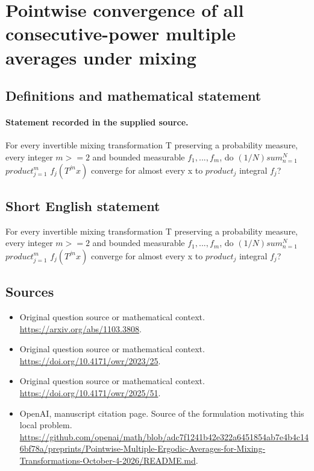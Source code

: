 \documentclass[11pt]{article}
\begin{document}
\section*{Pointwise convergence of all consecutive-power multiple averages under mixing}\label{statement}
\subsection{Definitions and mathematical statement}
\paragraph{Statement recorded in the supplied source.}
For every invertible mixing transformation T preserving a probability measure, every integer $m>=2$ and bounded measurable $f_1,...,f_m$, do $(1/N)sum_{n=1}^N$ $product_{j=1}^m$ $f_j(T^{jn}x)$ converge for almost every x to $product_j$ integral $f_j$?
\subsection{Short English statement}
For every invertible mixing transformation T preserving a probability measure, every integer $m>=2$ and bounded measurable $f_1,...,f_m$, do $(1/N)sum_{n=1}^N$ $product_{j=1}^m$ $f_j(T^{jn}x)$ converge for almost every x to $product_j$ integral $f_j$?
\subsection{Sources}
\begin{itemize}
\item[S1] Original question source or mathematical context.
\url{https://arxiv.org/abs/1103.3808}.
\item[S2] Original question source or mathematical context.
\url{https://doi.org/10.4171/owr/2023/25}.
\item[S3] Original question source or mathematical context.
\url{https://doi.org/10.4171/owr/2025/51}.
\item[S4] OpenAI, manuscript citation page. Source of the formulation motivating this local problem.
\url{https://github.com/openai/math/blob/adc7f1241b42e322a6451854ab7e4b4c146bf78a/preprints/Pointwise-Multiple-Ergodic-Averages-for-Mixing-Transformations-October-4-2026/README.md}.
\end{itemize}
\end{document}

